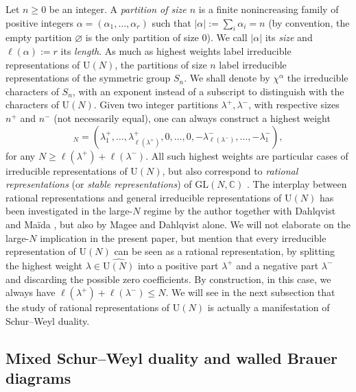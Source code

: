 \documentclass[11pt,a4paper,reqno]{article}
\theoremstyle{definition}
\theoremstyle{remark}
\newcommand\GL{{\mathrm{GL}}}
\newcommand\U{{\mathrm U}}
\newcommand\C{\mathbb{C}}
\begin{document}
Let $n\geq 0$ be an integer. A \emph{partition of size $n$} is a finite nonincreasing family of positive integers $\alpha=(\alpha_1,\ldots,\alpha_r)$ such that $\vert\alpha\vert:=\sum_i \alpha_i=n$ (by convention, the empty partition $\varnothing$ is the only partition of size 0). We call $\vert\alpha\vert$ its \emph{size} and $\ell(\alpha):=r$ its \emph{length}. As much as highest weights label irreducible representations of $\U(N)$, the partitions of size $n$ label irreducible representations of the symmetric group $S_n$. We shall denote by $\chi^\alpha$ the irreducible characters of $S_n$, with an exponent instead of a subscript to distinguish with the characters of $\U(N)$. Given two integer partitions $\lambda^+,\lambda^-$, with respective sizes $n^+$ and $n^-$ (not necessarily equal), one can always construct a highest weight
\begin{equation}
[\lambda^+,\lambda^-]_N=(\lambda_1^+,\ldots,\lambda_{\ell(\lambda^+)}^+,0,\ldots,0,-\lambda_{\ell(\lambda^-)}^-,\ldots,-\lambda_1^-),
\end{equation}
for any $N\geq \ell(\lambda^+)+\ell(\lambda^-)$. All such highest weights are particular cases of irreducible representations of $\U(N)$, but also correspond to \emph{rational representations} (or \emph{stable representations}) of $\GL(N,\C)$ \cite{Lit1,Lit2,Sta84}. The interplay between rational representations and general irreducible representations of $\U(N)$ has been investigated in the large-$N$ regime by the author \cite{Lem22,Lem25} together with Dahlqvist \cite{DL23} and Ma\"ida \cite{LemMai25,LM2}, but also by Magee \cite{Mag,Mag2,MdlS26} and Dahlqvist \cite{Dah26} alone. We will not elaborate on the large-$N$ implication in the present paper, but mention that every irreducible representation of $\U(N)$ can be seen as a rational representation, by splitting the highest weight $\lambda\in\widehat{\U(N)}$ into a positive part $\lambda^+$ and a negative part $\lambda^-$ and discarding the possible zero coefficients. By construction, in this case, we always have $\ell(\lambda^+)+\ell(\lambda^-)\leq N$. We will see in the next subsection that the study of rational representations of $\U(N)$ is actually a manifestation of Schur--Weyl duality.

\subsection{Mixed Schur--Weyl duality and walled Brauer diagrams}\label{sec:mixed-schur-weyl}
\end{document}
